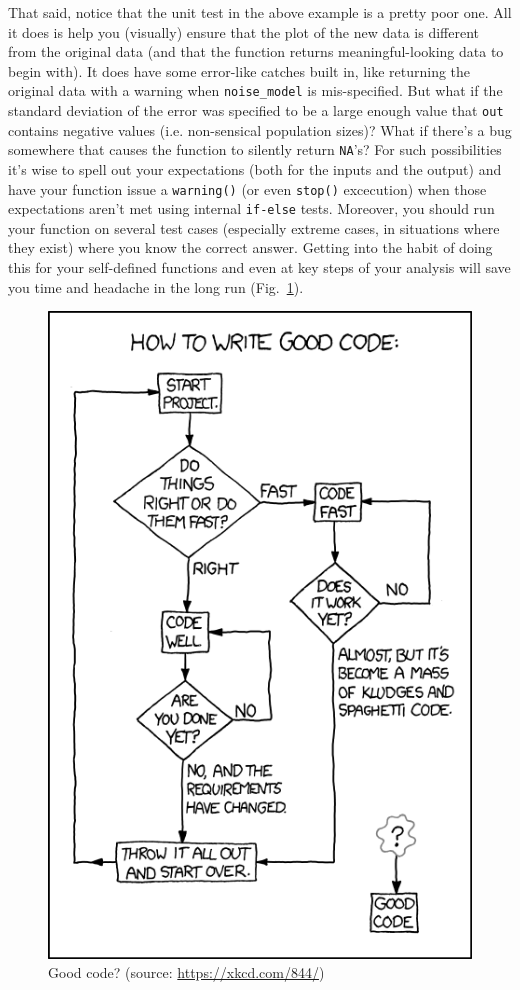 \documentclass[12pt,letterpaper]{article}
\begin{document}
That said, notice that the unit test in the above example is a pretty poor one.
All it does is help you (visually) ensure that the plot of the new data is 
different from the original data (and that the function returns 
meaningful-looking data to begin with).
It does have some error-like catches built in, like returning the original data with a warning when \texttt{noise\_model} is mis-specified.
But what if the standard deviation of the error was specified to be a large enough value that \texttt{out} contains negative values (i.e. non-sensical population sizes)?
What if there's a bug somewhere that causes the function to silently return \texttt{NA}'s?
For such possibilities it's wise to spell out your expectations (both for the inputs and the output) and have your function issue a \texttt{warning()} (or even \texttt{stop()} excecution) when those expectations aren't met using internal \texttt{if-else} tests.
Moreover, you should run your function on several test cases (especially extreme cases, in situations where they exist) where you know the correct answer.
Getting into the habit of doing this for your self-defined functions and even at key steps of your analysis will save you time and headache in the long run (Fig.~\ref{fig:goodcode}).

\begin{figure}[H]
	\centering
	\includegraphics[width=0.6\linewidth]{figs/goodcode.png}
	\caption{Good code? (source: \url{https://xkcd.com/844/})}
	\label{fig:goodcode}
\end{figure}
\end{document}

